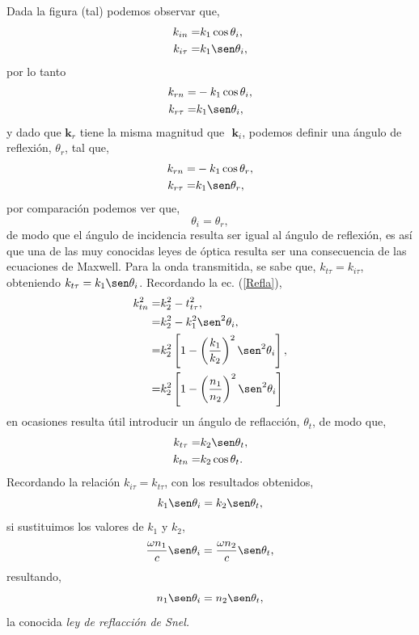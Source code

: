 \documentclass[11pt,fleqn]{book} %
\begin{document}
Dada la figura (tal) podemos observar que,
\begin{equation*}
\begin{split}
k_{in}=&k_1 \cos\theta_i,\\
k_{i\tau}=&k_1  \sen \theta_i,
\end{split}
\end{equation*}
 por lo tanto
\begin{equation*}
\begin{split}
k_{rn}=&-k_1 \cos\theta_i,\\
k_{r\tau}=&k_1  \sen \theta_i,
\end{split}
\end{equation*}
 y dado que $ \textbf{k}_r$ tiene la misma magnitud que $\textbf{ k}_i$, podemos definir una \'angulo de reflexi\'on, $\theta_r$, tal que,
\begin{equation*}
\begin{split}
k_{rn}=&-k_1 \cos\theta_r,\\
k_{r\tau}=&k_1  \sen \theta_r,
\end{split}
\end{equation*}
 por comparaci\'on podemos ver que,
 \begin{equation}
 \theta_i=\theta_r,
 \end{equation}
de modo que el \'angulo de incidencia resulta ser igual al \'angulo de reflexi\'on, es as\'i que una de las muy conocidas leyes de \'optica resulta ser una consecuencia de las ecuaciones de Maxwell.  Para la onda transmitida, se sabe que, $k_{t\tau}=k_{i\tau}$, obteniendo $k_{t\tau}=k_1 \sen \theta_i$.
Recordando la ec. (\ref{Refla}),
\begin{equation*}
\begin{split}
k_{tn}^2=&k_{2}^2-t_{t\tau}^2,\\
=&k_2^2-k_1^2 \sen ^2 \theta_i,\\
=& k_2^2 \left[ 1-\left( \frac{k_1}{k_2}  \right)^2 \sen ^2 \theta_i \right],\\
=& k_2^2 \left[ 1-\left( \frac{n_1}{n_2}  \right)^2 \sen ^2 \theta_i \right]
\end{split}
\end{equation*}
en ocasiones resulta \'util introducir un \'angulo de reflacci\'on, $\theta_t$, de modo que,
\begin{equation*}
\begin{split}
k_{t\tau}=&k_2 \sen \theta_{t},\\
k_{tn}=&k_2 \cos \theta_{t}.\\
\end{split}
\end{equation*}
 Recordando la relaci\'on $k_{i\tau}=k_{t\tau}$, con los resultados obtenidos,
 \begin{equation*}
 k_1 \sen \theta_i=k_2 \sen \theta_t,
 \end{equation*}
si sustituimos los valores de $k_1$ y $k_2$,
 \begin{equation*}
\frac{\omega n_1}{c} \sen \theta_i=\frac{\omega n_2 }{c} \sen \theta_t,
 \end{equation*}
resultando,
\begin{equation}
n_1\sen \theta_i=n_2\sen \theta_t,
\end{equation}
la conocida \textit{ley de reflacci\'on de Snel.}
\end{document}
